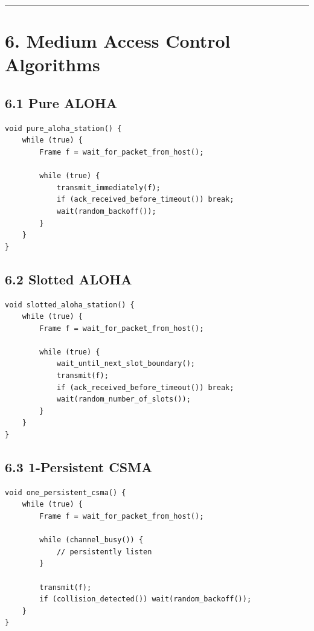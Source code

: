 \documentclass[11pt]{article}
\begin{document}
\begin{center}\rule{0.5\linewidth}{0.5pt}\end{center}

\section{6. Medium Access Control
Algorithms}\label{medium-access-control-algorithms}

\subsection{6.1 Pure ALOHA}\label{pure-aloha}

\begin{verbatim}
void pure_aloha_station() {
    while (true) {
        Frame f = wait_for_packet_from_host();

        while (true) {
            transmit_immediately(f);
            if (ack_received_before_timeout()) break;
            wait(random_backoff());
        }
    }
}
\end{verbatim}

\subsection{6.2 Slotted ALOHA}\label{slotted-aloha}

\begin{verbatim}
void slotted_aloha_station() {
    while (true) {
        Frame f = wait_for_packet_from_host();

        while (true) {
            wait_until_next_slot_boundary();
            transmit(f);
            if (ack_received_before_timeout()) break;
            wait(random_number_of_slots());
        }
    }
}
\end{verbatim}

\subsection{6.3 1-Persistent CSMA}\label{persistent-csma}

\begin{verbatim}
void one_persistent_csma() {
    while (true) {
        Frame f = wait_for_packet_from_host();

        while (channel_busy()) {
            // persistently listen
        }

        transmit(f);
        if (collision_detected()) wait(random_backoff());
    }
}
\end{verbatim}
\end{document}
